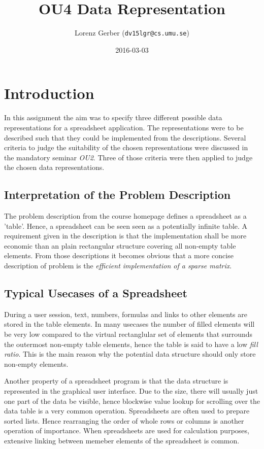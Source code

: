 \documentclass[a4paper,11pt,twoside]{article}
\title{OU4 Data Representation}
\author{Lorenz Gerber ({\tt{dv15lgr@cs.umu.se}})}
\date{2016-03-03}
\begin{document}
\lstset{language=C}
\maketitle

\tableofcontents
\newpage

\section{Introduction} 
In this assignment the aim was to specify three different possible
data representations for a spreadsheet application. The
representations were to be described such that they could be implemented
from the descriptions. Several criteria to judge the suitability of
the chosen representations were discussed in the mandatory seminar
\emph{OU2}. Three of those criteria were then applied to judge the
chosen data representations.


\subsection{Interpretation of the Problem Description}
The problem description from the course homepage defines a spreadsheet
as a 'table'. Hence, a spreadsheet can be seen seen as a potentially
infinite table. A requirement given in the description is that the
implementation shall be more economic than an plain rectangular
structure covering all non-empty table elements. From those
descriptions it becomes obvious that a more concise description of
problem is the \emph{efficient implementation of a sparse matrix}. 

\subsection{Typical Usecases of a Spreadsheet}
During a user session, text, numbers, formulas and links to
other elements are stored in the table elements. In many usecases the
number of filled elements will be very low compared to the virtual
rectanglular set of elements that surrounds the outermost non-empty
table elements, hence the table is said to have a low \emph{fill
 ratio}. This is the main reason why the potential data structure
should only store non-empty elements.

Another property of a spreadsheet program is that the data
structure is represented in the graphical user interface. Due to the
size, there will usually just one part of the data be visible, hence
blockwise value lookup for scrolling over the data table is a very
common operation. Spreadsheets are often used to prepare sorted
lists. Hence rearranging the order of whole rows or columns is another
operation of importance. When spreadsheets are used for calculation
purposes, extensive linking between memeber elements of the
spreadsheet is common.
\end{document}
